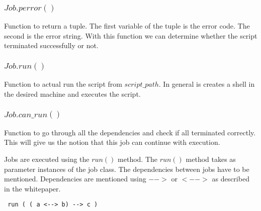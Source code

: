\subsubsection*{$Job.perror()$}
Function to return a tuple. The first variable of the tuple is the error code. The second is the error string.
With this function we can determine whether the script terminated successfully or not.
\subsubsection*{$Job.run()$}
Function to actual run the script from $script\_path$. In general is creates a shell in the desired machine
and executes the script.
\subsubsection*{$Job.can\_run()$}
Function to go through all the dependencies and check if all terminated correctly. This will give us the notion
that this job can continue with execution.

Jobs are executed using the $run()$ method. The $run()$ method takes as parameter instances of the job class.
The dependencies between jobs have to be mentioned. Dependencies are mentioned using $-->$ or $<-->$ as described in the whitepaper.

\begin{verbatim}
 run ( ( a <--> b) --> c )
\end{verbatim}
